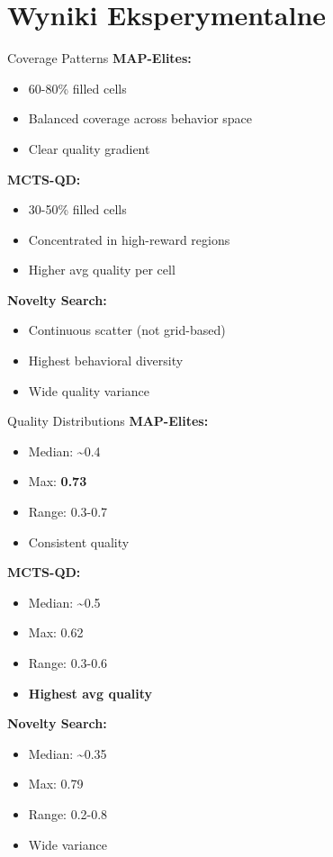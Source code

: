 \documentclass{beamer}
\begin{document}
\section{Wyniki Eksperymentalne}

\begin{frame}{Coverage Patterns}
\textbf{MAP-Elites:}
\begin{itemize}
\item 60-80\% filled cells
\item Balanced coverage across behavior space
\item Clear quality gradient
\end{itemize}

\vspace{0.3cm}
\textbf{MCTS-QD:}
\begin{itemize}
\item 30-50\% filled cells
\item Concentrated in high-reward regions
\item Higher avg quality per cell
\end{itemize}

\vspace{0.3cm}
\textbf{Novelty Search:}
\begin{itemize}
\item Continuous scatter (not grid-based)
\item Highest behavioral diversity
\item Wide quality variance
\end{itemize}
\end{frame}

\begin{frame}{Quality Distributions}
\textbf{MAP-Elites:}
\begin{itemize}
\item Median: \textasciitilde0.4
\item Max: \textbf{0.73}
\item Range: 0.3-0.7
\item Consistent quality
\end{itemize}

\vspace{0.3cm}
\textbf{MCTS-QD:}
\begin{itemize}
\item Median: \textasciitilde0.5
\item Max: 0.62
\item Range: 0.3-0.6
\item \textbf{Highest avg quality}
\end{itemize}

\vspace{0.3cm}
\textbf{Novelty Search:}
\begin{itemize}
\item Median: \textasciitilde0.35
\item Max: 0.79
\item Range: 0.2-0.8
\item Wide variance
\end{itemize}
\end{frame}
\end{document}
